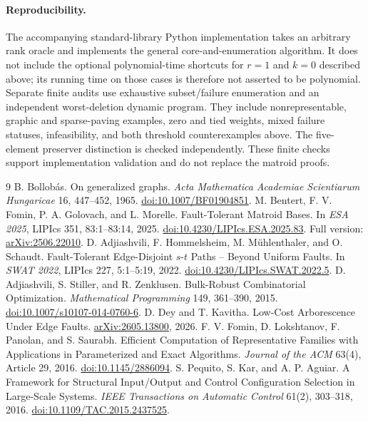 \documentclass[11pt]{article}
\theoremstyle{definition}\newtheorem{definition}[theorem]{Definition}
\theoremstyle{remark}\newtheorem{remark}[theorem]{Remark}
\begin{document}
\paragraph{Reproducibility.}
The accompanying standard-library Python implementation takes an arbitrary rank oracle and implements the general core-and-enumeration algorithm. It does not include the optional polynomial-time shortcuts for $r=1$ and $k=0$ described above; its running time on those cases is therefore not asserted to be polynomial. Separate finite audits use exhaustive subset/failure enumeration and an independent worst-deletion dynamic program. They include nonrepresentable, graphic and sparse-paving examples, zero and tied weights, mixed failure statuses, infeasibility, and both threshold counterexamples above. The five-element preserver distinction is checked independently. These finite checks support implementation validation and do not replace the matroid proofs.

\begin{thebibliography}{9}
\small
{} B. Bollob\'as.
On generalized graphs.
\emph{Acta Mathematica Academiae Scientiarum Hungaricae} 16, 447--452, 1965.
\href{https://doi.org/10.1007/BF01904851}{doi:10.1007/BF01904851}.
 M. Bentert, F. V. Fomin, P. A. Golovach, and L. Morelle.
Fault-Tolerant Matroid Bases. In \emph{ESA 2025}, LIPIcs 351, 83:1--83:14, 2025.
\href{https://doi.org/10.4230/LIPIcs.ESA.2025.83}{doi:10.4230/LIPIcs.ESA.2025.83}.
Full version: \href{https://arxiv.org/abs/2506.22010}{arXiv:2506.22010}.
 D. Adjiashvili, F. Hommelsheim, M. M\"uhlenthaler, and O. Schaudt.
Fault-Tolerant Edge-Disjoint $s$-$t$ Paths -- Beyond Uniform Faults.
In \emph{SWAT 2022}, LIPIcs 227, 5:1--5:19, 2022.
\href{https://doi.org/10.4230/LIPIcs.SWAT.2022.5}{doi:10.4230/LIPIcs.SWAT.2022.5}.
 D. Adjiashvili, S. Stiller, and R. Zenklusen.
Bulk-Robust Combinatorial Optimization.
\emph{Mathematical Programming} 149, 361--390, 2015.
\href{https://doi.org/10.1007/s10107-014-0760-6}{doi:10.1007/s10107-014-0760-6}.
 D. Dey and T. Kavitha.
Low-Cost Arborescence Under Edge Faults.
\href{https://arxiv.org/abs/2605.13800}{arXiv:2605.13800}, 2026.
 F. V. Fomin, D. Lokshtanov, F. Panolan, and S. Saurabh.
Efficient Computation of Representative Families with Applications in Parameterized and Exact Algorithms.
\emph{Journal of the ACM} 63(4), Article 29, 2016.
\href{https://doi.org/10.1145/2886094}{doi:10.1145/2886094}.
 S. Pequito, S. Kar, and A. P. Aguiar.
A Framework for Structural Input/Output and Control Configuration Selection in Large-Scale Systems.
\emph{IEEE Transactions on Automatic Control} 61(2), 303--318, 2016.
\href{https://doi.org/10.1109/TAC.2015.2437525}{doi:10.1109/TAC.2015.2437525}.
\end{thebibliography}
\end{document}
